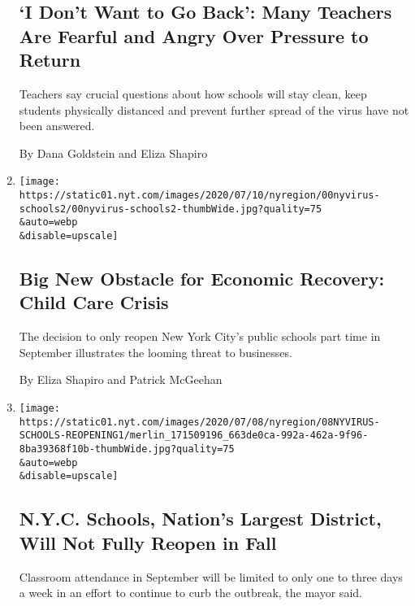 \begin{enumerate}
  \hypertarget{i-dont-want-to-go-back-many-teachers-are-fearful-and-angry-over-pressure-to-return}{%
  \subsection{`I Don't Want to Go Back': Many Teachers Are Fearful and
  Angry Over Pressure to
  Return}\label{i-dont-want-to-go-back-many-teachers-are-fearful-and-angry-over-pressure-to-return}}

  Teachers say crucial questions about how schools will stay clean, keep
  students physically distanced and prevent further spread of the virus
  have not been answered.

  By Dana Goldstein and Eliza Shapiro
\item
  \href{/2020/07/10/nyregion/nyc-school-daycare-reopening.html}{}

  \texttt{[image: https://static01.nyt.com/images/2020/07/10/nyregion/00nyvirus-schools2/00nyvirus-schools2-thumbWide.jpg?quality=75\\\&auto=webp\\\&disable=upscale]}

  \hypertarget{big-new-obstacle-for-economic-recovery-child-care-crisis}{%
  \subsection{Big New Obstacle for Economic Recovery: Child Care
  Crisis}\label{big-new-obstacle-for-economic-recovery-child-care-crisis}}

  The decision to only reopen New York City's public schools part time
  in September illustrates the looming threat to businesses.

  By Eliza Shapiro and Patrick McGeehan
\item
  \href{/2020/07/08/nyregion/nyc-schools-reopening-plan.html}{}

  \texttt{[image: https://static01.nyt.com/images/2020/07/08/nyregion/08NYVIRUS-SCHOOLS-REOPENING1/merlin\_171509196\_663de0ca-992a-462a-9f96-8ba39368f10b-thumbWide.jpg?quality=75\\\&auto=webp\\\&disable=upscale]}

  \hypertarget{nyc-schools-nations-largest-district-will-not-fully-reopen-in-fall}{%
  \subsection{N.Y.C. Schools, Nation's Largest District, Will Not Fully
  Reopen in
  Fall}\label{nyc-schools-nations-largest-district-will-not-fully-reopen-in-fall}}

  Classroom attendance in September will be limited to only one to three
  days a week in an effort to continue to curb the outbreak, the mayor
  said.


\end{enumerate}
